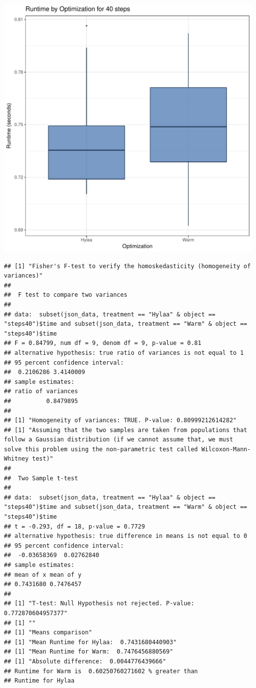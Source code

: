 \documentclass{article}\usepackage[]{graphicx}\usepackage[]{color}
\makeatletter
\def\maxwidth{ %
  \ifdim\Gin@nat@width>\linewidth
    \linewidth
  \else
    \Gin@nat@width
  \fi
}
\newenvironment{kframe}{%
 \def\at@end@of@kframe{}%
 \ifinner\ifhmode%
  \def\at@end@of@kframe{\end{minipage}}%
  \begin{minipage}{\columnwidth}%
 \fi\fi%
 \def\FrameCommand##1{\hskip\@totalleftmargin \hskip-\fboxsep
 \colorbox{shadecolor}{##1}\hskip-\fboxsep
     \hskip-\linewidth \hskip-\@totalleftmargin \hskip\columnwidth}%
 \MakeFramed {\advance\hsize-\width
   \@totalleftmargin\z@ \linewidth\hsize
   \@setminipage}}%
 {\par\unskip\endMakeFramed%
 \at@end@of@kframe}
\newenvironment{knitrout}{}{} %
\makeatother
\begin{document}
\begin{knitrout}
\color{fgcolor}
\includegraphics[width=\maxwidth]{figure/RH1_steps40-1} 
\begin{kframe}\begin{verbatim}
## [1] "Fisher's F-test to verify the homoskedasticity (homogeneity of variances)"
## 
## 	F test to compare two variances
## 
## data:  subset(json_data, treatment == "Hylaa" & object == "steps40")$time and subset(json_data, treatment == "Warm" & object == "steps40")$time
## F = 0.84799, num df = 9, denom df = 9, p-value = 0.81
## alternative hypothesis: true ratio of variances is not equal to 1
## 95 percent confidence interval:
##  0.2106286 3.4140009
## sample estimates:
## ratio of variances 
##          0.8479895 
## 
## [1] "Homogeneity of variances: TRUE. P-value: 0.80999212614282"
## [1] "Assuming that the two samples are taken from populations that follow a Gaussian distribution (if we cannot assume that, we must solve this problem using the non-parametric test called Wilcoxon-Mann-Whitney test)"
## 
## 	Two Sample t-test
## 
## data:  subset(json_data, treatment == "Hylaa" & object == "steps40")$time and subset(json_data, treatment == "Warm" & object == "steps40")$time
## t = -0.293, df = 18, p-value = 0.7729
## alternative hypothesis: true difference in means is not equal to 0
## 95 percent confidence interval:
##  -0.03658369  0.02762840
## sample estimates:
## mean of x mean of y 
## 0.7431680 0.7476457 
## 
## [1] "T-test: Null Hypothesis not rejected. P-value: 0.772870604957377"
## [1] ""
## [1] "Means comparison"
## [1] "Mean Runtime for Hylaa:  0.7431680440903"
## [1] "Mean Runtime for Warm:  0.7476456880569"
## [1] "Absolute difference:  0.0044776439666"
## Runtime for Warm is  0.60250760271602 % greater than 
## Runtime for Hylaa
\end{verbatim}
\end{kframe}
\end{knitrout}
\end{document}
